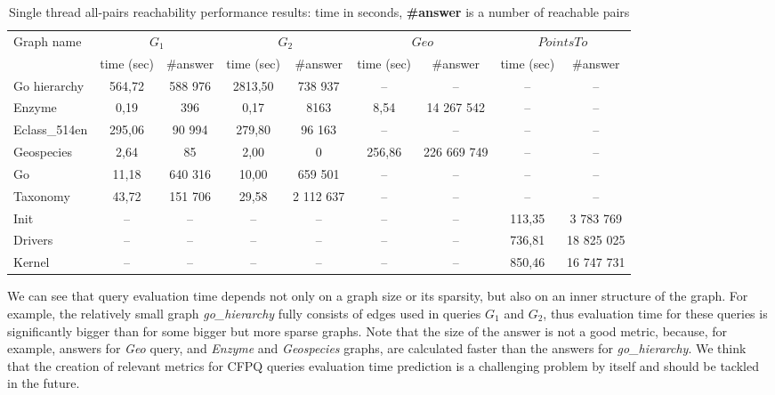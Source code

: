 \begin{table}[h]
    \centering
    \begin{tabular}{| l | c | c | c | c | c | c | c | c |}
         \hline
         \multirow{2}{*}{Graph name} & \multicolumn{2}{c|}{$G_1$} & \multicolumn{2}{c|}{$G_2$} & \multicolumn{2}{c|}{$Geo$} & \multicolumn{2}{c|}{$PointsTo$} \\
         \cline{2-9}
         & time (sec) & \#answer & time (sec) & \#answer & time (sec) & \#answer & time (sec) & \#answer \\
         \hline
         \hline
         Go hierarchy       & 564,72 & 588 976 & 2813,50 & 738 937 & -- & -- & -- & --\\
         Enzyme             & 0,19   & 396     & 0,17    & 8163    & 8,54 & 14 267 542 & -- & -- \\
         Eclass\_514en      & 295,06 & 90 994  & 279,80  & 96 163  & -- & -- & -- & -- \\
         Geospecies         & 2,64   & 85      & 2,00    & 0       & 256,86 & 226 669 749 & -- & --\\
         Go                 & 11,18  & 640 316 & 10,00   & 659 501 & -- & -- & -- & --\\
         Taxonomy           & 43,72  & 151 706 & 29,58 & 2 112 637 & -- & -- & -- & --\\
         \hline
         Init               & --     & --      & --    & --        & -- & -- & 113,35 & 3 783 769\\
         Drivers            & --     & --      & --    & --        & -- & -- & 736,81 & 18 825 025\\
         Kernel             & --     & --      & --    & --        & -- & -- & 850,46 & 16 747 731\\
         
         \hline
    \end{tabular}
    \caption{Single thread all-pairs reachability performance results: time in seconds, \textbf{\#answer} is a number of reachable pairs}
    \label{tab:single_thread_all_pairs}
\end{table}

We can see that query evaluation time depends not only on a graph size or its sparsity, but also on an inner structure of the graph. For example, the relatively small graph \textit{go\_hierarchy} fully consists of edges used in queries $G_1$ and $G_2$, thus evaluation time for these queries is significantly bigger than for some bigger but more sparse graphs. Note that the size of the answer is not a good metric, because, for example, answers for \textit{Geo} query, and \textit{Enzyme} and \textit{Geospecies} graphs, are calculated faster than the answers for \textit{go\_hierarchy}. We think that the creation of relevant metrics for CFPQ queries evaluation time prediction is a challenging problem by itself and should be tackled in the future.

